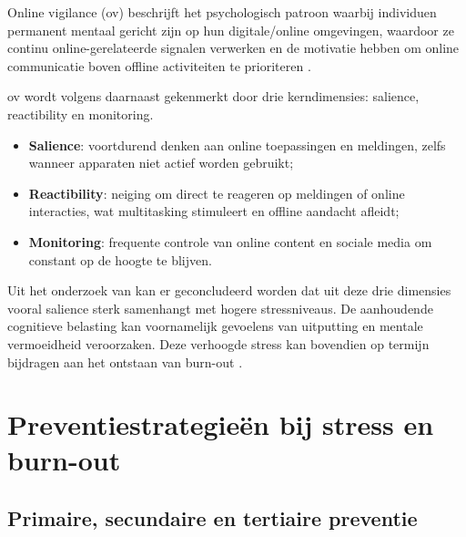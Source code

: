 \vspace{1em}

Online vigilance (\acrshort{ov}) beschrijft het psychologisch patroon waarbij individuen permanent mentaal gericht zijn op hun digitale/online omgevingen, waardoor ze continu online-gerelateerde signalen verwerken en de motivatie hebben om online communicatie boven offline activiteiten te prioriteren \autocite{Reinecke2018}.

\vspace{1em}

\acrshort{ov} wordt volgens \textcite{Reinecke2018} daarnaast gekenmerkt door drie kerndimensies: salience, reactibility en monitoring.

\begin{itemize}
    \item \textbf{Salience}: voortdurend denken aan online toepassingen en meldingen, zelfs wanneer apparaten niet actief worden gebruikt;
    \item \textbf{Reactibility}: neiging om direct te reageren op meldingen of online interacties, wat multitasking stimuleert en offline aandacht afleidt;
    \item \textbf{Monitoring}: frequente controle van online content en sociale media om constant op de hoogte te blijven.
\end{itemize}

Uit het onderzoek van \textcite{Freytag2020} kan er geconcludeerd worden dat uit deze drie dimensies vooral salience sterk samenhangt met hogere stressniveaus. De aanhoudende cognitieve belasting kan voornamelijk gevoelens van uitputting en mentale vermoeidheid veroorzaken. Deze verhoogde stress kan bovendien op termijn bijdragen aan het ontstaan van burn-out \autocite{Petkovski2025}.

\newpage




\section{Preventiestrategieën bij stress en burn-out}
\label{sec:preventie-behandeling}

\subsection{Primaire, secundaire en tertiaire preventie}
\label{subsec:preventie-types}

